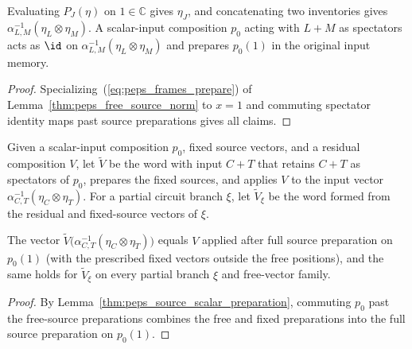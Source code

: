 \begin{lemma}
    \label{thm:peps_source_scalar_preparation}
    \leanok
    Evaluating $P_J(\eta)$ on $1\in\mathbb C$ gives $\eta_J$, and concatenating two inventories gives
    $\alpha_{L,M}^{-1}(\eta_L\otimes\eta_M)$. A scalar-input composition
    $p_0$ acting with $L+M$ as spectators acts as $\id$ on $\alpha_{L,M}^{-1}(\eta_L\otimes\eta_M)$ and prepares $p_0(1)$ in the original input memory.
\end{lemma}
\begin{proof}
    \leanok
    Specializing~(\ref{eq:peps_frames_prepare}) of Lemma~\ref{thm:peps_free_source_norm} to $x=1$ and commuting spectator identity maps past source preparations gives all claims.
\end{proof}

\begin{definition}
    \label{def:peps_prepared_reordered_word}
    \leanok
    Given a scalar-input composition $p_0$, fixed
    source vectors, and a residual composition $V$, let $\widetilde V$ be the word with input $C+T$ that
    retains $C+T$ as spectators of $p_0$, prepares the
    fixed sources, and applies $V$ to the input vector
    $\alpha_{C,T}^{-1}(\eta_C\otimes\eta_T)$.
    For a partial circuit branch $\xi$, let $\widetilde V_\xi$ be the word formed from the residual and fixed-source vectors of $\xi$.
\end{definition}

\begin{lemma}
    \label{thm:peps_prepared_reordered_vector}
    \leanok
    The vector $\widetilde V\bigl(\alpha_{C,T}^{-1}(\eta_C\otimes\eta_T)\bigr)$ equals $V$ applied after full source preparation on $p_0(1)$ (with the prescribed
    fixed vectors outside the free positions), and the same holds for $\widetilde V_\xi$ on every partial branch $\xi$ and free-vector family.
\end{lemma}
\begin{proof}
    \leanok
    By Lemma~\ref{thm:peps_source_scalar_preparation}, commuting $p_0$ past the free-source preparations combines the free and fixed preparations into the full source preparation on $p_0(1)$.
\end{proof}


